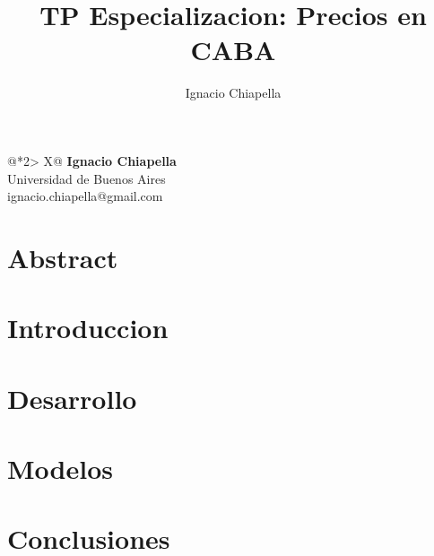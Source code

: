 \documentclass{icisfinal}
\title{TP Especializacion: Precios en CABA}
\begin{document}
\author{Ignacio Chiapella}
\maketitle

\begin{table}[h!]
  \centering
  \LARGE
  \begin{tabularx}{\textwidth}{@{}*2{>
  {\centering\arraybackslash}X}@{}}       
    \textbf{Ignacio Chiapella} \\
    Universidad de Buenos Aires   \\
    ignacio.chiapella@gmail.com 
  \end{tabularx}
\end{table}


\tableofcontents

\newpage
\section{Abstract}


\section{Introduccion}


\newpage
\section{Desarrollo}


\newpage
\section{Modelos}



\newpage
\section{Conclusiones}


\printbibliography
\newpage
\printindex
\end{document}
